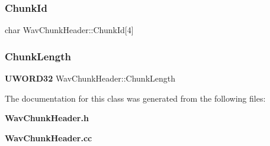 \subsubsection{Chunk\+Id}
{\footnotesize\ttfamily char Wav\+Chunk\+Header\+::\+Chunk\+Id[4]\hspace{0.3cm}{\ttfamily [private]}}

\mbox{\label{classWavChunkHeader_aae2290f9c2cca139e55759e37e711ac4}} 
\subsubsection{Chunk\+Length}
{\footnotesize\ttfamily \textbf{ U\+W\+O\+R\+D32} Wav\+Chunk\+Header\+::\+Chunk\+Length\hspace{0.3cm}{\ttfamily [private]}}



The documentation for this class was generated from the following files\+:\begin{DoxyCompactItemize}
\item 
\textbf{ Wav\+Chunk\+Header.\+h}\item 
\textbf{ Wav\+Chunk\+Header.\+cc}\end{DoxyCompactItemize}
